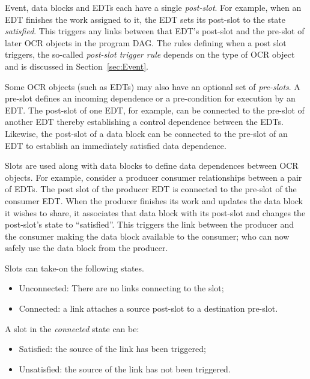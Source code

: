 Event, data blocks and EDTs each have a
single \emph{post-slot}.
For example, when an EDT finishes the work
assigned to it, the EDT sets its post-slot to the state \emph{satisfied}.
This triggers any links between that EDT's post-slot and the pre-slot of later OCR
objects in the program DAG.   The rules
defining when a post slot triggers, the so-called \emph{post-slot
trigger rule} depends on the type of OCR
object and is discussed in Section~\ref{sec:Event}.

Some OCR objects (such as EDTs) may also have an optional set of
\emph{pre-slots}. A pre-slot defines an incoming
dependence or a pre-condition for execution by an EDT. The post-slot
of one EDT, for example, can be connected to the pre-slot of another
EDT thereby establishing a control dependence between the EDTs. Likewise,
the post-slot of a data block can be connected to the pre-slot of an EDT
to establish an immediately satisfied data dependence.

Slots are used along with data blocks to define data
dependences between OCR objects. For example,
consider a producer consumer relationships between a pair of EDTs.  The post slot of the producer EDT is connected to
the pre-slot of the consumer EDT. When the producer finishes its work
and updates the data block it wishes to share, it associates that data
block with its post-slot and changes the post-slot's state to ``satisfied''.  This triggers
the link between the producer and the consumer making the data block
available to the consumer; who can now safely use the data block from
the producer.

Slots can take-on the following states.
\begin{itemize}
\item Unconnected: There are no links connecting to the slot;
\item Connected: a link attaches a source post-slot to a destination pre-slot.
\end{itemize}
A slot in the \emph{connected} state can be:
\begin{itemize}
\item Satisfied: the source of the link has been triggered;
\item Unsatisfied: the source of the link has not been triggered.
\end{itemize}

